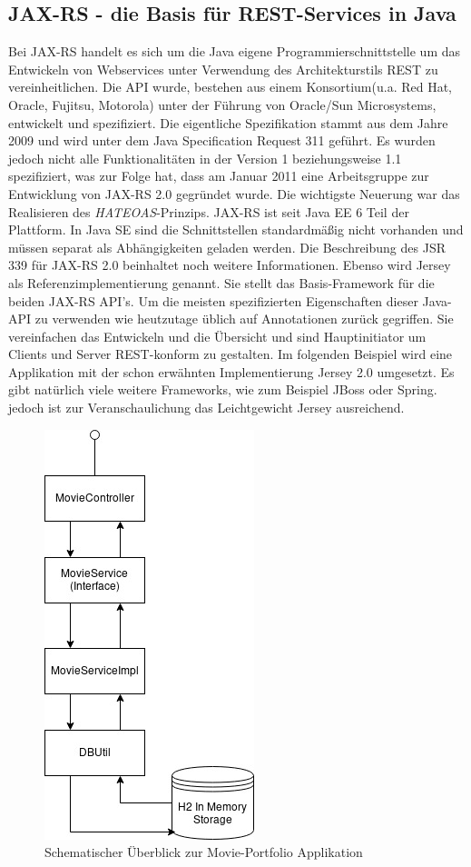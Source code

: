 \documentclass[fleqn,10.5pt,ngerman]{SelfArx}
\begin{document}
\subsection{JAX-RS - die Basis für REST-Services in Java}
Bei JAX-RS handelt es sich um die Java eigene Programmierschnittstelle um das Entwickeln von Webservices unter Verwendung des Architekturstils REST zu vereinheitlichen. Die API wurde, bestehen aus einem Konsortium(u.a. Red Hat, Oracle, Fujitsu, Motorola) unter der Führung von Oracle/Sun Microsystems, entwickelt und spezifiziert. Die eigentliche Spezifikation \cite{jaxrs1.1} stammt aus dem Jahre 2009 und wird unter dem Java Specification Request \cite{spezreq} 311 geführt. Es wurden jedoch nicht alle Funktionalitäten in der Version 1 beziehungsweise 1.1 spezifiziert, was zur Folge hat, dass am Januar 2011 eine Arbeitsgruppe zur Entwicklung von JAX-RS 2.0 gegründet wurde. Die wichtigste Neuerung war das Realisieren des \textit{HATEOAS}-Prinzips. JAX-RS ist seit Java EE 6 Teil der Plattform. In Java SE sind die Schnittstellen standardmäßig nicht vorhanden und müssen separat als Abhängigkeiten geladen werden. Die Beschreibung des JSR 339 für JAX-RS 2.0 \cite{spezJSR339} beinhaltet noch weitere Informationen. Ebenso wird Jersey \cite{jersey} als Referenzimplementierung genannt. Sie stellt das Basis-Framework für die beiden JAX-RS API's. Um die meisten spezifizierten Eigenschaften dieser Java-API zu verwenden wie heutzutage üblich auf Annotationen zurück gegriffen. Sie vereinfachen das Entwickeln und die Übersicht und sind Hauptinitiator um Clients und Server REST-konform zu gestalten. Im folgenden Beispiel wird eine Applikation mit der schon erwähnten Implementierung Jersey 2.0 umgesetzt. Es gibt natürlich viele weitere Frameworks, wie zum Beispiel JBoss oder Spring. jedoch ist zur Veranschaulichung das Leichtgewicht Jersey ausreichend.
\begin{figure}[ht]\centering
	\includegraphics[width=6 cm]{Abbildungen/overview.jpg}
	\caption{Schematischer Überblick zur Movie-Portfolio Applikation}
	\label{fig:overview}
\end{figure}
\end{document}
